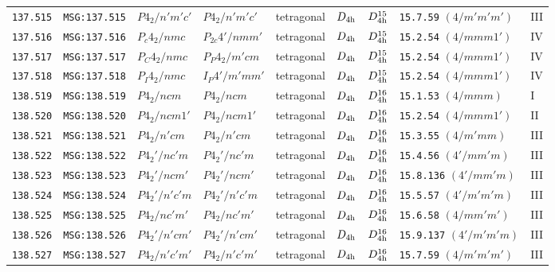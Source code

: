 \documentclass[fleqn,10pt]{jsarticle}
\begin{document}
\begin{center}
\begin{longtable}{lllllllll}
\texttt{137.515} & \texttt{MSG:137.515} & $P4_{2}/n'm'c'$ & $P4_{2}/n'm'c'$ & tetragonal & $D_{\rm 4h}$ & $D_{\rm 4h}^{15}$ & \texttt{15.7.59} $(4/m'm'm')$ & III \\
\texttt{137.516} & \texttt{MSG:137.516} & $P_{c}4_{2}/nmc$ & $P_{2c}4'/nmm'$ & tetragonal & $D_{\rm 4h}$ & $D_{\rm 4h}^{15}$ & \texttt{15.2.54} $(4/mmm1')$ & IV \\
\texttt{137.517} & \texttt{MSG:137.517} & $P_{C}4_{2}/nmc$ & $P_{P}4_{2}/m'cm$ & tetragonal & $D_{\rm 4h}$ & $D_{\rm 4h}^{15}$ & \texttt{15.2.54} $(4/mmm1')$ & IV \\
\texttt{137.518} & \texttt{MSG:137.518} & $P_{I}4_{2}/nmc$ & $I_{P}4'/m'mm'$ & tetragonal & $D_{\rm 4h}$ & $D_{\rm 4h}^{15}$ & \texttt{15.2.54} $(4/mmm1')$ & IV \\ \hline
\texttt{138.519} & \texttt{MSG:138.519} & $P4_{2}/ncm$ & $P4_{2}/ncm$ & tetragonal & $D_{\rm 4h}$ & $D_{\rm 4h}^{16}$ & \texttt{15.1.53} $(4/mmm)$ & I \\
\texttt{138.520} & \texttt{MSG:138.520} & $P4_{2}/ncm1'$ & $P4_{2}/ncm1'$ & tetragonal & $D_{\rm 4h}$ & $D_{\rm 4h}^{16}$ & \texttt{15.2.54} $(4/mmm1')$ & II \\
\texttt{138.521} & \texttt{MSG:138.521} & $P4_{2}/n'cm$ & $P4_{2}/n'cm$ & tetragonal & $D_{\rm 4h}$ & $D_{\rm 4h}^{16}$ & \texttt{15.3.55} $(4/m'mm)$ & III \\
\texttt{138.522} & \texttt{MSG:138.522} & $P4_{2}'/nc'm$ & $P4_{2}'/nc'm$ & tetragonal & $D_{\rm 4h}$ & $D_{\rm 4h}^{16}$ & \texttt{15.4.56} $(4'/mm'm)$ & III \\
\texttt{138.523} & \texttt{MSG:138.523} & $P4_{2}'/ncm'$ & $P4_{2}'/ncm'$ & tetragonal & $D_{\rm 4h}$ & $D_{\rm 4h}^{16}$ & \texttt{15.8.136} $(4'/mm'm)$ & III \\
\texttt{138.524} & \texttt{MSG:138.524} & $P4_{2}'/n'c'm$ & $P4_{2}'/n'c'm$ & tetragonal & $D_{\rm 4h}$ & $D_{\rm 4h}^{16}$ & \texttt{15.5.57} $(4'/m'm'm)$ & III \\
\texttt{138.525} & \texttt{MSG:138.525} & $P4_{2}/nc'm'$ & $P4_{2}/nc'm'$ & tetragonal & $D_{\rm 4h}$ & $D_{\rm 4h}^{16}$ & \texttt{15.6.58} $(4/mm'm')$ & III \\
\texttt{138.526} & \texttt{MSG:138.526} & $P4_{2}'/n'cm'$ & $P4_{2}'/n'cm'$ & tetragonal & $D_{\rm 4h}$ & $D_{\rm 4h}^{16}$ & \texttt{15.9.137} $(4'/m'm'm)$ & III \\
\texttt{138.527} & \texttt{MSG:138.527} & $P4_{2}/n'c'm'$ & $P4_{2}/n'c'm'$ & tetragonal & $D_{\rm 4h}$ & $D_{\rm 4h}^{16}$ & \texttt{15.7.59} $(4/m'm'm')$ & III \\

\end{longtable}
\end{center}
\end{document}
